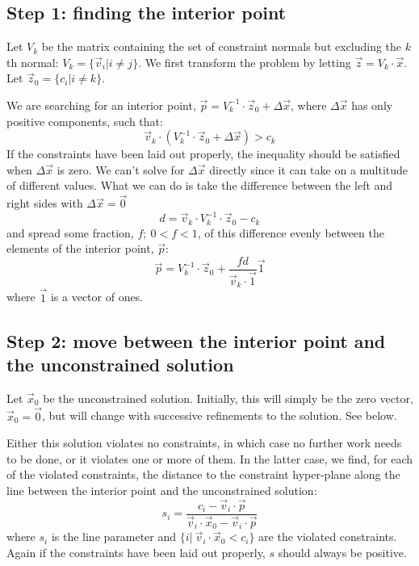 \documentclass{article}
\begin{document}
\subsection{Step 1: finding the interior point}

Let $V_k$ be the matrix containing the set of constraint normals but
excluding the $k$th normal: $V_k = \lbrace \vec v_i | i \ne j \rbrace$. 
We first transform the problem by letting $\vec z=V_k \cdot \vec x$.
Let $\vec z_0 = \lbrace c_i | i \ne k \rbrace$.

We are searching for an interior point, 
$\vec p = V_k^{-1} \cdot \vec z_0 + \Delta \vec x$, 
where $\Delta \vec x$ has only positive components, such that:
\begin{equation}
	\vec v_k \cdot \left ( V_k^{-1} \cdot \vec z_0 + \Delta \vec x \right ) > c_k
\end{equation}
If the constraints have been laid out properly, the inequality should be 
satisfied when $\Delta \vec x$ is zero.
We can't solve for $\Delta \vec x$ directly since it can take on a 
multitude of different values. What we can do is
take the difference between the left and right sides with $\Delta \vec x = \vec 0$
\begin{equation}
	d = \vec v_k \cdot V_k^{-1} \cdot \vec z_0 - c_k
\end{equation}
and spread some fraction, $f;~0 < f < 1$, of this difference evenly between the 
elements of the interior point, $\vec p$:
\begin{equation}
	\vec p = V_k^{-1} \cdot \vec z_0 + \frac{f d}{\vec v_k \cdot \vec 1} \vec 1
\end{equation}
where $\vec 1$ is a vector of ones.

\subsection{Step 2: move between the interior point and the unconstrained solution}

Let $\vec x_0$ be the unconstrained solution. Initially, this will simply be
the zero vector, $\vec x_0 = \vec 0$, but will change with successive 
refinements to the solution. See below. 

Either this solution violates no constraints,
in which case no further work needs to be done, or
it violates one or more of them. In the latter case, we find, for each of the
violated constraints, the distance
to the constraint hyper-plane along the line between the interior point and
the unconstrained solution:
\begin{equation}
	s_i = \frac{c_i - \vec v_i \cdot \vec p}
	{\vec v_i \cdot \vec x_0 - \vec v_i \cdot \vec p}
\end{equation}
where $s_i$ is the line parameter and
$\lbrace i |~\vec v_i \cdot \vec x_0 < c_i \rbrace$ are the violated
constraints. Again if the constraints have been laid out properly, $s$ should
always be positive.
\end{document}

